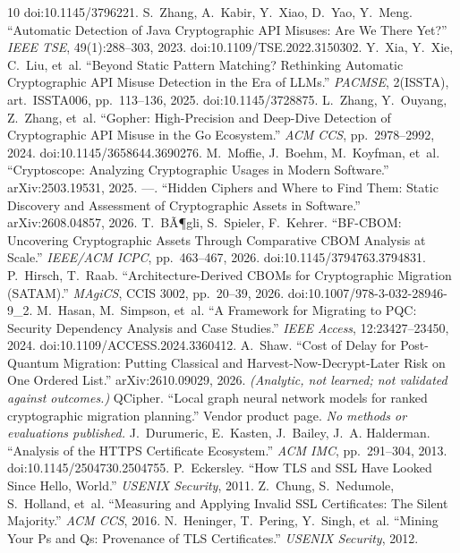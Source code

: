 \documentclass[conference]{IEEEtran}
\begin{document}
\begin{thebibliography}{10}
doi:10.1145/3796221.
 S.~Zhang, A.~Kabir, Y.~Xiao, D.~Yao, Y.~Meng. ``Automatic Detection of
Java Cryptographic API Misuses: Are We There Yet?'' \emph{IEEE TSE}, 49(1):288--303, 2023.
doi:10.1109/TSE.2022.3150302.
 Y.~Xia, Y.~Xie, C.~Liu, et~al. ``Beyond Static Pattern Matching? Rethinking
Automatic Cryptographic API Misuse Detection in the Era of LLMs.'' \emph{PACMSE}, 2(ISSTA),
art.~ISSTA006, pp.~113--136, 2025. doi:10.1145/3728875.
 L.~Zhang, Y.~Ouyang, Z.~Zhang, et~al. ``Gopher: High-Precision and
Deep-Dive Detection of Cryptographic API Misuse in the Go Ecosystem.'' \emph{ACM CCS},
pp.~2978--2992, 2024. doi:10.1145/3658644.3690276.
 M.~Moffie, J.~Boehm, M.~Koyfman, et~al. ``Cryptoscope: Analyzing
Cryptographic Usages in Modern Software.'' arXiv:2503.19531, 2025.
 ---. ``Hidden Ciphers and Where to Find Them: Static Discovery and
Assessment of Cryptographic Assets in Software.'' arXiv:2608.04857, 2026.
 T.~BÃ¶gli, S.~Spieler, F.~Kehrer. ``BF-CBOM: Uncovering Cryptographic Assets
Through Comparative CBOM Analysis at Scale.'' \emph{IEEE/ACM ICPC}, pp.~463--467, 2026.
doi:10.1145/3794763.3794831.
 P.~Hirsch, T.~Raab. ``Architecture-Derived CBOMs for Cryptographic Migration
(SATAM).'' \emph{MAgiCS}, CCIS 3002, pp.~20--39, 2026.
doi:10.1007/978-3-032-28946-9\_2.
 M.~Hasan, M.~Simpson, et~al. ``A Framework for Migrating to PQC: Security
Dependency Analysis and Case Studies.'' \emph{IEEE Access}, 12:23427--23450, 2024.
doi:10.1109/ACCESS.2024.3360412.
 A.~Shaw. ``Cost of Delay for Post-Quantum Migration: Putting Classical
and Harvest-Now-Decrypt-Later Risk on One Ordered List.'' arXiv:2610.09029, 2026.
\textit{(Analytic, not learned; not validated against outcomes.)}
 QCipher. ``Local graph neural network models for ranked cryptographic
migration planning.'' Vendor product page. \textit{No methods or evaluations published.}
 J.~Durumeric, E.~Kasten, J.~Bailey, J.~A. Halderman. ``Analysis of
the HTTPS Certificate Ecosystem.'' \emph{ACM IMC}, pp.~291--304, 2013.
doi:10.1145/2504730.2504755.
 P.~Eckersley. ``How TLS and SSL Have Looked Since Hello, World.''
\emph{USENIX Security}, 2011.
 Z.~Chung, S.~Nedumole, S.~Holland, et~al. ``Measuring and Applying Invalid
SSL Certificates: The Silent Majority.'' \emph{ACM CCS}, 2016.
 N.~Heninger, T.~Pering, Y.~Singh, et~al. ``Mining Your Ps and Qs:
Provenance of TLS Certificates.'' \emph{USENIX Security}, 2012.

\end{thebibliography}
\end{document}
